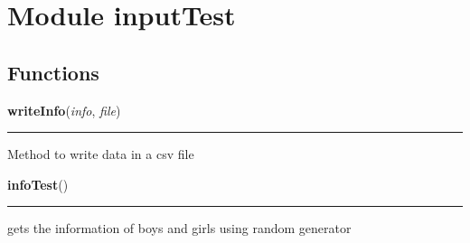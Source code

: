 %
%
%


\section{Module inputTest}

    \label{inputTest}


  \subsection{Functions}

    \label{inputTest:writeInfo}

    \vspace{0.5ex}

\hspace{.8\funcindent}\begin{boxedminipage}{\funcwidth}

    \raggedright \textbf{writeInfo}(\textit{info}, \textit{file})

    \vspace{-1.5ex}

    \rule{\textwidth}{0.5\fboxrule}
\setlength{\parskip}{2ex}
    Method to write data in a csv file

\setlength{\parskip}{1ex}
    \end{boxedminipage}

    \label{inputTest:infoTest}

    \vspace{0.5ex}

\hspace{.8\funcindent}\begin{boxedminipage}{\funcwidth}

    \raggedright \textbf{infoTest}()

    \vspace{-1.5ex}

    \rule{\textwidth}{0.5\fboxrule}
\setlength{\parskip}{2ex}
    gets the information of boys and girls using random generator

\setlength{\parskip}{1ex}
    \end{boxedminipage}


